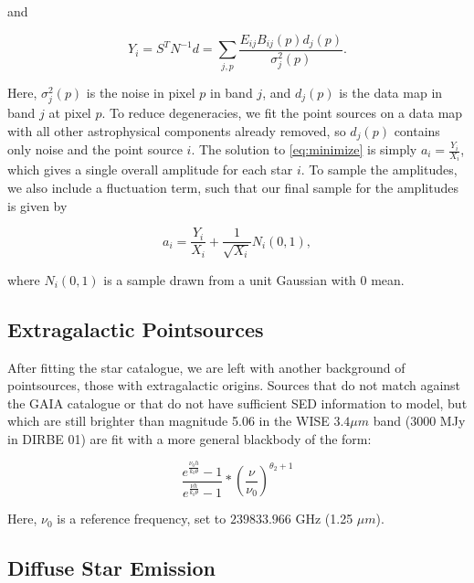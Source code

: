 \documentclass{aa}
\begin{document}
and

\begin{equation}
Y_i = S^TN^{-1}d = \sum_{j,p} \frac{E_{ij}B_{ij}(p) d_j(p)}{\sigma_j^2(p)}.
\end{equation}

Here, $\sigma_j^2(p)$ is the noise in pixel $p$ in band $j$, and $d_j(p)$ is the data map in band $j$ at pixel $p$. To reduce degeneracies, we fit the point sources on a data map with all other astrophysical components already removed, so $d_j(p)$ contains only noise and the point source $i$. The solution to \ref{eq:minimize} is simply $a_i = \frac{Y_i}{X_i}$, which gives a single overall amplitude for each star $i$. To sample the amplitudes, we also include a fluctuation term, such that our final sample for the amplitudes is given by

\begin{equation}
a_i = \frac{Y_i}{X_i} + \frac{1}{\sqrt{X_i}} N_i(0,1),
\end{equation}

where $N_i(0,1)$ is a sample drawn from a unit Gaussian with 0 mean.

\subsection{Extragalactic Pointsources}

\label{sec:extragalacticmodel}

After fitting the star catalogue, we are left with another background of pointsources, those with extragalactic origins. Sources that do not match against the GAIA catalogue or that do not have sufficient SED information to model, but which are still brighter than magnitude 5.06 in the WISE $3.4 \mu m$ band ($3000$ MJy in DIRBE 01) are fit with a more general blackbody of the form:

\begin{equation}
\frac{e^{\frac{\nu_0 h}{k_b \theta}} - 1}{e^{\frac{\nu h}{k_b \theta}} - 1} * (\frac{\nu}{\nu_0})^{\theta_2 + 1}
\end{equation}

Here, $\nu_0$ is a reference frequency, set to $239833.966$ GHz (1.25 $\mu m$). 



\subsection{Diffuse Star Emission}

\label{sec:diffusemodel}
\end{document}
